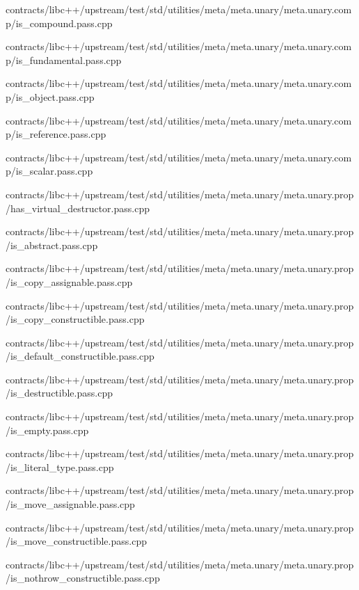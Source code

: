 \begin{DoxyCompactItemize}
contracts/libc++/upstream/test/std/utilities/meta/meta.\+unary/meta.\+unary.\+comp/is\+\_\+compound.\+pass.\+cpp\item 
contracts/libc++/upstream/test/std/utilities/meta/meta.\+unary/meta.\+unary.\+comp/is\+\_\+fundamental.\+pass.\+cpp\item 
contracts/libc++/upstream/test/std/utilities/meta/meta.\+unary/meta.\+unary.\+comp/is\+\_\+object.\+pass.\+cpp\item 
contracts/libc++/upstream/test/std/utilities/meta/meta.\+unary/meta.\+unary.\+comp/is\+\_\+reference.\+pass.\+cpp\item 
contracts/libc++/upstream/test/std/utilities/meta/meta.\+unary/meta.\+unary.\+comp/is\+\_\+scalar.\+pass.\+cpp\item 
contracts/libc++/upstream/test/std/utilities/meta/meta.\+unary/meta.\+unary.\+prop/has\+\_\+virtual\+\_\+destructor.\+pass.\+cpp\item 
contracts/libc++/upstream/test/std/utilities/meta/meta.\+unary/meta.\+unary.\+prop/is\+\_\+abstract.\+pass.\+cpp\item 
contracts/libc++/upstream/test/std/utilities/meta/meta.\+unary/meta.\+unary.\+prop/is\+\_\+copy\+\_\+assignable.\+pass.\+cpp\item 
contracts/libc++/upstream/test/std/utilities/meta/meta.\+unary/meta.\+unary.\+prop/is\+\_\+copy\+\_\+constructible.\+pass.\+cpp\item 
contracts/libc++/upstream/test/std/utilities/meta/meta.\+unary/meta.\+unary.\+prop/is\+\_\+default\+\_\+constructible.\+pass.\+cpp\item 
contracts/libc++/upstream/test/std/utilities/meta/meta.\+unary/meta.\+unary.\+prop/is\+\_\+destructible.\+pass.\+cpp\item 
contracts/libc++/upstream/test/std/utilities/meta/meta.\+unary/meta.\+unary.\+prop/is\+\_\+empty.\+pass.\+cpp\item 
contracts/libc++/upstream/test/std/utilities/meta/meta.\+unary/meta.\+unary.\+prop/is\+\_\+literal\+\_\+type.\+pass.\+cpp\item 
contracts/libc++/upstream/test/std/utilities/meta/meta.\+unary/meta.\+unary.\+prop/is\+\_\+move\+\_\+assignable.\+pass.\+cpp\item 
contracts/libc++/upstream/test/std/utilities/meta/meta.\+unary/meta.\+unary.\+prop/is\+\_\+move\+\_\+constructible.\+pass.\+cpp\item 
contracts/libc++/upstream/test/std/utilities/meta/meta.\+unary/meta.\+unary.\+prop/is\+\_\+nothrow\+\_\+constructible.\+pass.\+cpp\item 

\end{DoxyCompactItemize}
